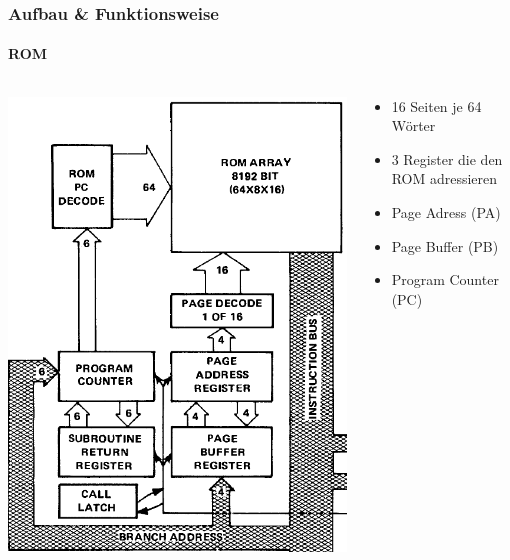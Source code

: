 \begin{frame}
\frametitle{Aufbau \& Funktionsweise}
	  \framesubtitle{ROM}
		 \begin{columns}
      \begin{column}{5cm}
    		\includegraphics[scale=0.3]{images/ROM.PNG}
      \end{column}
      \begin{column}{5cm}
       \begin{itemize}
        \item 16 Seiten je 64 W{\"o}rter \pause
        \item 3 Register die den ROM adressieren \pause
        \item Page Adress (PA) \pause
        \item Page Buffer (PB) \pause
        \item Program Counter (PC)
       \end{itemize}
      \end{column}
     \end{columns}
\end{frame}


